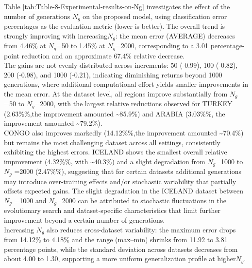 \documentclass[12pt]{Definitions/academia}
\begin{document}
Table \ref{tab:Table-8-Experimental-results-on-Ng} investigates the effect
of the number of generations $N_{g}$ on the proposed model, using
classification error percentages as the evaluation metric (lower is
better). The overall trend is strongly improving with increasing$N_{g}$:
the mean error (AVERAGE) decreases from 4.46\% at $N_{g}$=50 to 1.45\%
at $N_{g}$=2000, corresponding to a 3.01 percentage-point reduction
and an approximate 67.4\% relative decrease.\\
 The gains are not evenly
distributed across increments: 50 (-0.99), 100
(-0.82), 200 (-0.98), and 1000
(-0.21), indicating diminishing returns beyond 1000 generations, where
additional computational effort yields smaller improvements in the
mean error. At the dataset level, all regions improve substantially
from $N_{g}$=50 to $N_{g}$=2000, with the largest relative reductions
observed for TURKEY (2.63\%\%,the improvement amounted \textasciitilde 85.9\%)
and ARABIA (3.03\%\%, the improvement amounted \textasciitilde 79.2\%).\\
CONGO also improves markedly (14.12\%\%,the improvement amounted \textasciitilde 70.4\%)
but remains the most challenging dataset across all settings, consistently
exhibiting the highest errors. ICELAND shows the smallest overall
relative improvement (4.32\%\%, with \textasciitilde 40.3\%)
and a slight degradation from $N_{g}$=1000 to$N_{g}$ =2000 (2.47\%\%),
suggesting that for certain datasets additional generations may introduce
over-training effects and/or stochastic variability that partially
offsets expected gains. The slight degradation in the ICELAND dataset
between$N_{g}$ =1000 and $N_{g}$=2000 can be attributed to stochastic
fluctuations in the evolutionary search and dataset\nobreakdash-specific
characteristics that limit further improvement beyond a certain number
of generations.\\
 Increasing $N_{g}$ also reduces cross-dataset variability:
the maximum error drops from 14.12\% to 4.18\% and the range (max--min)
shrinks from 11.92 to 3.81 percentage points, while the standard deviation
across datasets decreases from about 4.00 to 1.30, supporting a more
uniform generalization profile at higher$N_{g}$.
\end{document}
